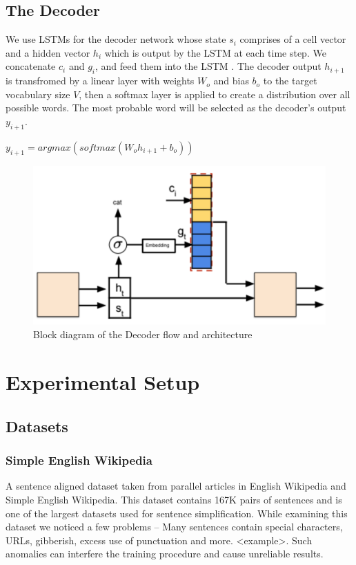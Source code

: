 \documentclass{article}
\begin{document}
\begin{flushleft}
\subsection{The Decoder}
We use LSTMs \cite{hochreiter1997lstm} for the decoder network whose state $s_i$ comprises of a cell vector and a hidden vector $h_i$ which is output by the LSTM at each time step. We concatenate $c_i$ and $g_i$, and feed them into the LSTM .
The decoder output $h_{i+1}$ is transfromed by a linear layer with weights $W_o$ and bias $b_o$ to the target vocabulary size $V$, then a softmax layer is applied to create a distribution over all possible words. The most probable word will be selected as the decoder's output $y_{i+1}$. 
\vspace{5mm}
\begin{center}
$y_{i+1}=argmax(softmax(W_oh_{i+1}+b_o))$\vspace{5mm}
\end{center}

\end{flushleft}

\begin{figure}[h]
    \centering
	\captionsetup{justification=centering,margin=2cm}
    \includegraphics[scale=0.35]{Decoder_Flow}
    \caption{Block diagram of the Decoder flow and architecture}
    \label{fig:dec}
\end{figure}

\section{Experimental Setup}
\subsection{Datasets}

\subsubsection{Simple English Wikipedia \cite{coster-kauchak-2011-simple}}
A sentence aligned dataset taken from parallel articles in English Wikipedia and Simple English Wikipedia. This dataset contains 167K pairs of sentences and is one of the largest datasets used for sentence simplification. While examining this dataset we noticed a few problems – Many sentences contain special characters, URLs, gibberish, excess use of punctuation and more. <example>. Such anomalies can interfere the training procedure and cause unreliable results.
\end{document}
